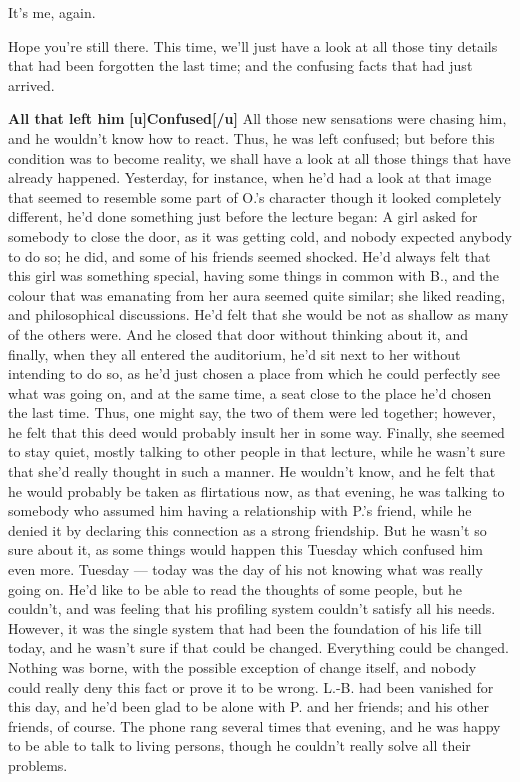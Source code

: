 It's me, again. 

Hope you're still there. This time, we'll just have a look at all those tiny details that had been forgotten the last time; and the confusing facts that had just arrived. 

\textbf{All that left him}
\textbf{[u]Confused[/u]}
All those new sensations were chasing him, and he wouldn't know how to react. Thus, he was left confused; but before this condition was to become reality, we shall have a look at all those things that have already happened. Yesterday, for instance, when he'd had a look at that image that seemed to resemble some part of O.'s character though it looked completely different, he'd done something just before the lecture began: A girl asked for somebody to close the door, as it was getting cold, and nobody expected anybody to do so; he did, and some of his friends seemed shocked. He'd always felt that this girl was something special, having some things in common with B., and the colour that was emanating from her aura seemed quite similar; she liked reading, and philosophical discussions. He'd felt that she would be not as shallow as many of the others were. 
And he closed that door without thinking about it, and finally, when they all entered the auditorium, he'd sit next to her without intending to do so, as he'd just chosen a place from which he could perfectly see what was going on, and at the same time, a seat close to the place he'd chosen the last time. 
Thus, one might say, the two of them were led together; however, he felt that this deed would probably insult her in some way. Finally, she seemed to stay quiet, mostly talking to other people in that lecture, while he wasn't sure that she'd really thought in such a manner. He wouldn't know, and he felt that he would probably be taken as flirtatious now, as that evening, he was talking to somebody who assumed him having a relationship with P.'s friend, while he denied it by declaring this connection as a strong friendship. But he wasn't so sure about it, as some things would happen this Tuesday which confused him even more. 
Tuesday --- today was the day of his not knowing what was really going on. He'd like to be able to read the thoughts of some people, but he couldn't, and was feeling that his profiling system couldn't satisfy all his needs. However, it was the single system that had been the foundation of his life till today, and he wasn't sure if that could be changed. 
Everything could be changed. Nothing was borne, with the possible exception of change itself, and nobody could really deny this fact or prove it to be wrong. L.-B. had been vanished for this day, and he'd been glad to be alone with P. and her friends; and his other friends, of course. The phone rang several times that evening, and he was happy to be able to talk to living persons, though he couldn't really solve all their problems. 
